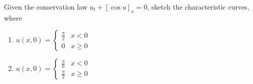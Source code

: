 \item Given the conservation law $u_t + [\cos u]_x = 0$, sketch the characteristic curves, where
%
\begin{enumerate}
  \item
  $
  \displaystyle
  u(x, 0) =
  \begin{cases}
    \frac{\pi}{2} & x < 0\\
    0 & x \geq 0
  \end{cases}
  $

  \item
  $
  \displaystyle
  u(x, 0) =
  \begin{cases}
    \frac{\pi}{6} & x < 0\\
    \frac{\pi}{2} & x \geq 0
  \end{cases}
  $
\end{enumerate}

\bigbreak
